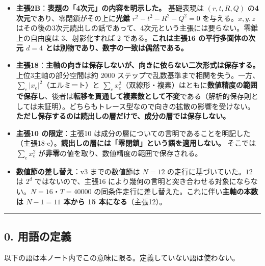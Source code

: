 \documentclass[
  10pt,
]{ltjsarticle}
\providecommand{\tightlist}{%
  \setlength{\itemsep}{0pt}\setlength{\parskip}{0pt}}
\begin{document}
\begin{itemize}
\tightlist
\item
  \textbf{主張2B}：\textbf{表題の「4次元」の内容を明示した。} 基礎表現は
  \((r,t,R,Q)\) の\textbf{4次元}であり、零閉鎖がその上に\textbf{光錐}
  \(r^2-t^2-R^2-Q^2=0\) を与える。\(x,y,z\)
  はその後の3次元読出しの話であって、4次元という主張には要らない。零錐上の自由度は
  3、射影化すれば 2 である。\textbf{これは主張16 の平行多面体の次元
  \(d=4\) とは別物であり、数字の一致は偶然である。}
\item
  \textbf{主張18}：\textbf{主軸の向きは保存しないが、向きに依らない二次形式は保存する。}
  上位3主軸の部分空間は約 2000
  ステップで乱数基準まで相関を失う。一方、\(\sum_e\lvert x_e\rvert^2\)（エルミート）と
  \(\sum_e x_e^2\)（双線形・複素）はともに\textbf{数値精度の範囲で保存し}、後者は\textbf{転移を貫通して複素数として不変}である（解析的保存則としては未証明）。どちらもトレース型なので向きの拡散の影響を受けない。\textbf{ただし保存するのは読出しの層だけで、成分の層では保存しない。}
\item
  \textbf{主張10 の限定}：主張10
  は成分の層についての言明であることを明記した（主張18-e）。\textbf{読出しの層には「零閉鎖」という語を適用しない。}
  そこでは \(\sum_e x_e^2\)
  が\textbf{非零}の値を取り、数値精度の範囲で保存される。
\item
  \textbf{数値節の差し替え}：v3 までの数値節は \(N=12\)
  の走行に基づいていた。\(12\) は \(2^d\) ではないので、主張16
  により幾何の言明と突き合わせる対象にならない。\(N=16\)・\(T=40000\)
  の同条件走行に差し替えた。これに伴い\textbf{主軸の本数は \(N-1 = 11\)
  本から 15 本になる}（主張12）。
\end{itemize}

\begin{center}\rule{0.5\linewidth}{0.5pt}\end{center}

\subsection{0. 用語の定義}\label{ux7528ux8a9eux306eux5b9aux7fa9}

以下の語は本ノート内でこの意味に限る。定義していない語は使わない。
\end{document}

